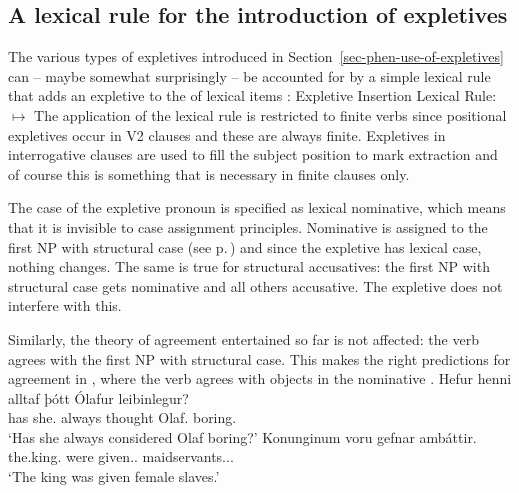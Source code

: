 \subsection{A lexical rule for the introduction of expletives}
\label{sec-analysis-expletives}

The various types of expletives introduced in Section~\ref{sec-phen-use-of-expletives} can -- maybe somewhat surprisingly -- be
accounted for by a simple lexical rule that adds an expletive to the \argstl of lexical items
\citep[]{MOe2011a}:
\ea
\label{positional-expl-lr}
Expletive Insertion Lexical Rule:\\
 $\mapsto$
\z
The application of the lexical rule is restricted to finite verbs since positional expletives occur
in V2 clauses and these are always finite. Expletives in interrogative clauses are used to fill
the subject position to mark extraction and of course this is something that is necessary in finite
clauses only.

The case of the expletive pronoun is specified as lexical nominative, which means that it is
invisible to case assignment principles. Nominative is assigned to the first NP with structural case
(see p.\,\pageref{case-p}) and since the expletive has lexical case, nothing changes. The same is
true for structural accusatives: the first NP with structural case gets nominative and all others
accusative. The expletive does not interfere with this.

Similarly, the theory of agreement entertained so far is not affected: the verb agrees with the
first NP with structural case. This makes the right predictions for agreement in , where
the verb agrees with objects in the nominative \citep[]{ZMT85a}.
\eal
\ex
\gll Hefur henni      alltaf þótt    Ólafur      leibinlegur?\footnotemark\\
     has   she.\DAT{} always thought Olaf.\NOM{} boring.\NOM{}\\\icelandic
{}
\glt `Has she always considered Olaf boring?'
\ex
\label{ex-dat-subj-passive-ditransitive-icelandic-two}
\gll Konunginum voru gefnar ambáttir.\footnotemark\\
     the.king.\DAT{} were given.\F.\PL{} maidservants.\NOM.\F.\PL\\
\glt `The king was given female slaves.'
\zl


